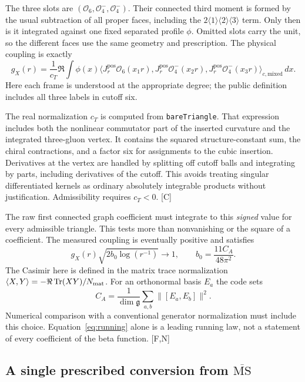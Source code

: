 \documentclass[11pt]{article}
\newcommand{\MS}{\overline{\mathrm{MS}}}
\newcommand{\code}[1]{{\small\nolinkurl{#1}}}
\newcommand{\src}[1]{\textsf{[#1]}}
\newcommand{\cO}{\mathcal O}
\begin{document}
The three slots are $(\cO_6,\cO_4^-,\cO_4^-)$. Their connected third
moment is formed by the usual subtraction of all proper faces,
including the $2\langle1\rangle\langle2\rangle\langle3\rangle$ term.
Only then is it integrated against one fixed separated profile $\phi$.
Omitted slots carry the unit, so the different faces use the same
geometry and prescription. The physical coupling is exactly
\begin{equation}\label{eq:coupling}
 g_X(r)=\frac{1}{c_T}\Re\int \phi(x)
 \bigl\langle J_r^{\mathrm{pos}}\cO_6(x_1r),
 J_r^{\mathrm{pos}}\cO_4^-(x_2r),
 J_r^{\mathrm{pos}}\cO_4^-(x_3r)\bigr\rangle_{\!c,\mathrm{mixed}}\,dx.
\end{equation}
Here each frame is understood at the appropriate degree; the public
definition includes all three labels in cutoff six.

The real normalization $c_T$ is computed from \code{bareTriangle}.
That expression includes both the nonlinear commutator part of the
inserted curvature and the integrated three-gluon vertex. It contains
the squared structure-constant sum, the chiral contractions, and a
factor six for assignments to the cubic insertion. Derivatives at
the vertex are handled by splitting off cutoff balls and integrating
by parts, including derivatives of the cutoff. This avoids treating
singular differentiated kernels as ordinary absolutely integrable
products without justification. Admissibility requires $c_T<0$.
\src{C}

The raw first connected graph coefficient must integrate to this
\emph{signed} value for every admissible triangle. This tests more than
nonvanishing or the square of a coefficient. The measured coupling is
eventually positive and satisfies
\begin{equation}\label{eq:running}
 g_X(r)\sqrt{2b_0\log(r^{-1})}\longrightarrow1,
 \qquad b_0=\frac{11C_A}{48\pi^2}.
\end{equation}
The Casimir here is defined in the matrix trace normalization
$\langle X,Y\rangle=-\Re\operatorname{Tr}(XY)/N_{\rm mat}$.
For an orthonormal basis $E_a$ the code sets
\[
 C_A=\frac{1}{\dim\mathfrak g}
           \sum_{a,b}\|[E_a,E_b]\|^2.
\]
Numerical comparison with a conventional generator normalization must
include this choice. Equation~\eqref{eq:running} alone is a leading
running law, not a statement of every coefficient of the beta function.
\src{F,N}

\subsection{A single prescribed conversion from \texorpdfstring{$\MS$}{MS-bar}}
\end{document}
